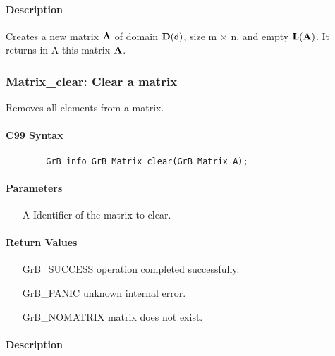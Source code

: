 \paragraph{Description}

Creates a new matrix ${\bf A}$ of domain $\bold{D}({\sf d})$, size {\sf m $\times$ n}, and
empty $\bold{L}({\bf A})$. It returns in {\sf A} this matrix ${\bf A}$.

\subsubsection{{\sf Matrix\_clear}: Clear a matrix}

Removes all elements from a matrix.

\paragraph{C99 Syntax}

\begin{verbatim}
        GrB_info GrB_Matrix_clear(GrB_Matrix A);
\end{verbatim}

\paragraph{Parameters}

\begin{itemize}[leftmargin=1.1in]
    \item[{\sf A}] Identifier of the matrix to clear.
\end{itemize}

\paragraph{Return Values}

\begin{itemize}[leftmargin=2.1in]
\item[{\sf GrB\_SUCCESS}]   operation completed successfully.
\item[{\sf GrB\_PANIC}]     unknown internal error.
\item[{\sf GrB\_NOMATRIX}]  matrix does not exist.
\end{itemize}

\paragraph{Description}

